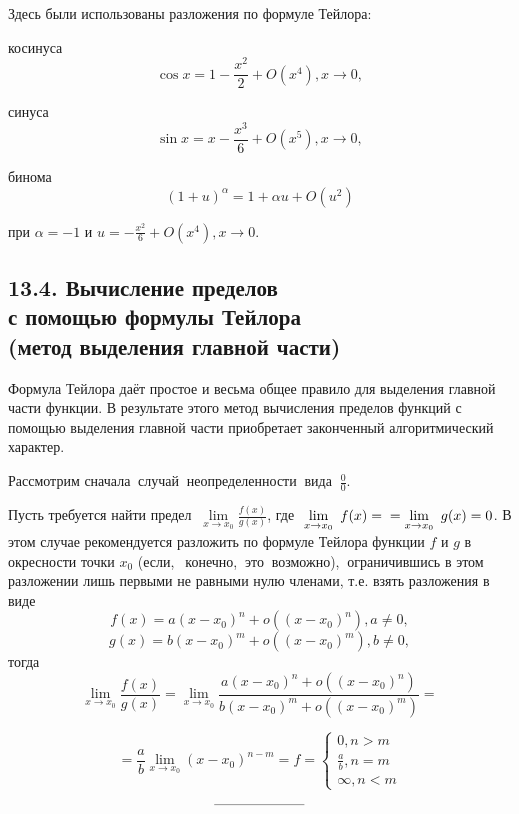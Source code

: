 \documentclass{article}
\begin{document}
\setcounter{page}{351} 
\setcounter{section}{13} 
\setcounter{subsection}{3} 
\linespread{1.01}
\begin{large}
\parindent=0cm Здесь были использованы разложения по формуле Тейлора:

\parindent=0.6cm косинуса
$$\cos x = 1 - 	\frac{x^2}{2}+O(x^4), x	\rightarrow0,$$

синуса
$$\sin x = x - 	\frac{x^3}{6}+O(x^5), x	\rightarrow0,$$

бинома
$$(1+u)^\alpha = 1+\alpha u+O(u^2)$$

\parindent=0cm при $\alpha = -1$ и $u = -\frac{x^2}{6} + O(x^4), x	\rightarrow0.$

\subsection*{\textbf{13.4. Вычисление пределов\\с помощью формулы Тейлора\\(метод выделения главной части)}}

Формула Тейлора даёт простое и весьма общее правило для выделения главной части функции. В результате этого метод вычисления пределов функций с помощью выделения главной части приобретает законченный алгоритмический характер.

\parindent=0.6cm Рассмотрим сначала$\ $ случай$\ $ неопределенности$\ $ вида $\ \frac{0}{0}$.

\parindent=0cm Пусть требуется найти предел 	$\ \lim\limits_{x\to x_0}\frac{f(x)}{g(x)}$, где $\ \lim\limits_{x\to x_0}\ f(x)=\\=\lim\limits_{x\to x_0}\ g(x)=0$. В этом случае рекомендуется разложить по формуле Тейлора функции $f$ и $g$ в окресности точки $x_0$ (если,$\ \ $ конечно,$\ $ это$\ $ возможно),$\ $ ограничившись в этом разложении лишь первыми не равными нулю членами, т.е. взять разложения в виде
$$f(x)=a(x-x_0)^n+o((x-x_0)^n), a\not=0,$$
$$g(x)=b(x-x_0)^m+o((x-x_0)^m), b\not=0,$$
тогда
$$\lim\limits_{x\to x_0}\frac{f(x)}{g(x)} = \lim\limits_{x\to x_0}\frac{a(x-x_0)^n+o((x-x_0)^n)}{b(x-x_0)^m+o((x-x_0)^m)} =$$ 

$$ = \frac{a}{b}\lim\limits_{x\to x_0}(x-x_0)^{n-m}= f =\begin{cases} 0, n>m \\  \frac{a}{b}, n = m \\ \infty, n<m \end{cases} $$

$$\\ \\ \\ \rule{65pt}{0.01cm}$$


\end{large}
\end{document}
